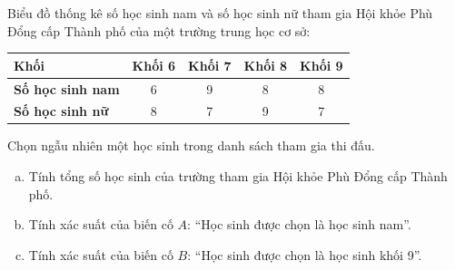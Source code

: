 \begin{bt}%
	Biểu đồ thống kê số học sinh nam và số học sinh nữ tham gia Hội khỏe Phù Đổng cấp Thành phố của một trường trung học cơ sở:
	\begin{center}
		\begin{tabular}{|l|c|c|c|c|}
			\hline
			\textbf{Khối} & Khối 6 & Khối 7 & Khối 8 & Khối 9 \\
			\hline
			\textbf{Số học sinh nam} & 6 & 9 & 8 & 8 \\
			\hline
			\textbf{Số học sinh nữ} & 8 & 7 & 9 & 7 \\
			\hline
		\end{tabular}
	\end{center}
	Chọn ngẫu nhiên một học sinh trong danh sách tham gia thi đấu.
	\begin{enumerate}[a)]
		\item Tính tổng số học sinh của trường tham gia Hội khỏe Phù Đổng cấp Thành phố.
		\item Tính xác suất của biến cố $A$: ``Học sinh được chọn là học sinh nam''.
		\item Tính xác suất của biến cố $B$: ``Học sinh được chọn là học sinh khối 9''.
	\end{enumerate}
\end{bt}

